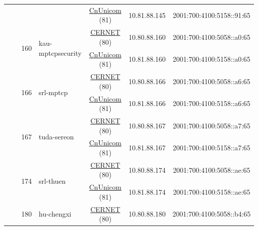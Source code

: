 \begin{small}
\begin{center}
\begin{longtable}{|c|c|c|c|c|c|c|c|}
  &  &  &  & \multicolumn{2}{|c|}{\tiny{\href{http://www.chinaunicom.com}{CnUnicom} (81)}} & \tiny{10.81.88.145} & \tiny{2001:700:4100:5158::91:65} \\* \cline{3-3}\cline{4-4}\cline{5-5}\cline{6-6}\cline{7-7}\cline{8-8}
  &  & \multirow{2}{*}{\tiny{160}} & \multicolumn{1}{|l|}{\multirow{2}{*}{\tiny{kau-mptcpsecurity}}} & \multicolumn{2}{|c|}{\tiny{\href{http://www.cernet.edu.cn}{CERNET} (80)}} & \tiny{10.80.88.160} & \tiny{2001:700:4100:5058::a0:65} \\* \cline{5-5}\cline{6-6}\cline{7-7}\cline{8-8}
  &  &  &  & \multicolumn{2}{|c|}{\tiny{\href{http://www.chinaunicom.com}{CnUnicom} (81)}} & \tiny{10.81.88.160} & \tiny{2001:700:4100:5158::a0:65} \\* \cline{3-3}\cline{4-4}\cline{5-5}\cline{6-6}\cline{7-7}\cline{8-8}
  &  & \multirow{2}{*}{\tiny{166}} & \multicolumn{1}{|l|}{\multirow{2}{*}{\tiny{srl-mptcp}}} & \multicolumn{2}{|c|}{\tiny{\href{http://www.cernet.edu.cn}{CERNET} (80)}} & \tiny{10.80.88.166} & \tiny{2001:700:4100:5058::a6:65} \\* \cline{5-5}\cline{6-6}\cline{7-7}\cline{8-8}
  &  &  &  & \multicolumn{2}{|c|}{\tiny{\href{http://www.chinaunicom.com}{CnUnicom} (81)}} & \tiny{10.81.88.166} & \tiny{2001:700:4100:5158::a6:65} \\* \cline{3-3}\cline{4-4}\cline{5-5}\cline{6-6}\cline{7-7}\cline{8-8}
  &  & \multirow{2}{*}{\tiny{167}} & \multicolumn{1}{|l|}{\multirow{2}{*}{\tiny{tuda-sereon}}} & \multicolumn{2}{|c|}{\tiny{\href{http://www.cernet.edu.cn}{CERNET} (80)}} & \tiny{10.80.88.167} & \tiny{2001:700:4100:5058::a7:65} \\* \cline{5-5}\cline{6-6}\cline{7-7}\cline{8-8}
  &  &  &  & \multicolumn{2}{|c|}{\tiny{\href{http://www.chinaunicom.com}{CnUnicom} (81)}} & \tiny{10.81.88.167} & \tiny{2001:700:4100:5158::a7:65} \\* \cline{3-3}\cline{4-4}\cline{5-5}\cline{6-6}\cline{7-7}\cline{8-8}
  &  & \multirow{2}{*}{\tiny{174}} & \multicolumn{1}{|l|}{\multirow{2}{*}{\tiny{srl-thuen}}} & \multicolumn{2}{|c|}{\tiny{\href{http://www.cernet.edu.cn}{CERNET} (80)}} & \tiny{10.80.88.174} & \tiny{2001:700:4100:5058::ae:65} \\* \cline{5-5}\cline{6-6}\cline{7-7}\cline{8-8}
  &  &  &  & \multicolumn{2}{|c|}{\tiny{\href{http://www.chinaunicom.com}{CnUnicom} (81)}} & \tiny{10.81.88.174} & \tiny{2001:700:4100:5158::ae:65} \\* \cline{3-3}\cline{4-4}\cline{5-5}\cline{6-6}\cline{7-7}\cline{8-8}
  &  & \multirow{2}{*}{\tiny{180}} & \multicolumn{1}{|l|}{\multirow{2}{*}{\tiny{hu-chengxi}}} & \multicolumn{2}{|c|}{\tiny{\href{http://www.cernet.edu.cn}{CERNET} (80)}} & \tiny{10.80.88.180} & \tiny{2001:700:4100:5058::b4:65} \\* \cline{5-5}\cline{6-6}\cline{7-7}\cline{8-8}

\end{longtable}
\end{center}
\end{small}
